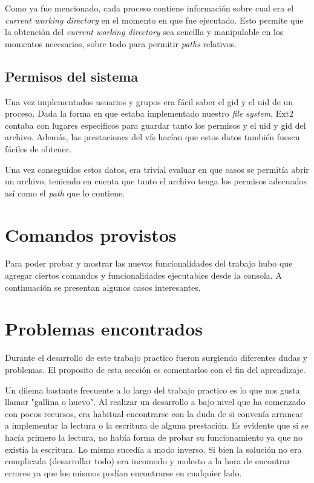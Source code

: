\documentclass[a4paper,10pt]{article}
\begin{document}
Como ya fue mencionado, cada proceso contiene información sobre cual era el \textit{current working directory} en
el momento en que fue ejecutado. Esto permite que la obtención del \textit{current working directory} sea sencilla
y manipulable en los momentos necesarios, sobre todo para permitir \textit{paths} relativos.

    
\subsection{Permisos del sistema}
Una vez implementados usuarios y grupos era fácil saber el gid y el uid de un proceso. Dada la forma en que estaba
implementado nuestro \textit{file system}, Ext2 contaba con lugares especificos para guardar tanto los permisos y el
uid y gid del archivo. Además, las prestaciones del vfs hacían que estos datos también fuesen fáciles de obtener.

Una vez conseguidos estos datos, era trivial evaluar en que casos se permitía abrir un archivo, teniendo en cuenta
que tanto el archivo tenga los permisos adecuados así como el \textit{path} que lo contiene.

\newpage
\section{Comandos provistos}
    Para poder probar y mostrar las nuevas funcionalidades del trabajo hubo que agregar ciertos comandos y
    funcionalidades ejecutables desde la consola. A continuación se presentan algunos casos interesantes.

\newpage
\section{Problemas encontrados}

Durante el desarrollo de este trabajo practico fueron surgiendo diferentes dudas y problemas. El proposito de esta
sección es comentarlos con el fin del aprendizaje.

Un dilema bastante frecuente a lo largo del trabajo practico es lo que nos gusta llamar "gallina o huevo". Al realizar
un desarrollo a bajo nivel que ha comenzado con pocos recursos, era habitual encontrarse con la duda de si convenía
arrancar a implementar la lectura o la escritura de alguna prestación. Es evidente que si se hacía primero la lectura, 
no había forma de probar su funcionamiento ya que no existía la escritura. Lo mismo sucedía a modo inverso. Si bien 
la solución no era complicada (desarrollar todo) era incomodo y molesto a la hora de encontrar errores ya que los mismos
podían encontrarse en cualquier lado.
\end{document}
